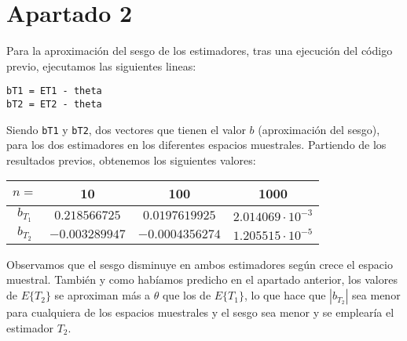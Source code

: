 \documentclass[a4paper,5pt,titlepage]{article}
\begin{document}
	\section{Apartado 2}
		Para la aproximación del sesgo de los estimadores, tras una ejecución del código previo, ejecutamos las siguientes lineas:
		\begin{lstlisting}
bT1 = ET1 - theta
bT2 = ET2 - theta
		\end{lstlisting}
		Siendo \texttt{bT1} y \texttt{bT2}, dos vectores que tienen el valor $b$ (aproximación del sesgo), para los dos estimadores en los diferentes espacios muestrales. Partiendo de los resultados previos, obtenemos los siguientes valores:
		\begin{center}
			\begin{tabular}{|c|c|c|c|}
				\hline
				$n=$  & 10 & 100 & 1000 \\
				\hline
				\hline
				$b_{T_1}$ & $0.218566725$ & $0.0197619925$ & $2.014069\cdot10^{-3}$ \\
				\hline
				$b_{T_2}$ & $-0.003289947$ & $-0.0004356274$ & $1.205515 \cdot10^{-5}$ \\
				\hline
			\end{tabular}
		\end{center}
		Observamos que el sesgo disminuye en ambos estimadores según crece el espacio muestral. También y como habíamos predicho en el apartado anterior, los valores de $E\{T_2\}$ se aproximan más a $\theta$ que los de $E\{T_1\}$, lo que hace que $|b_{T_2}|$ sea menor para cualquiera de los espacios muestrales y el sesgo sea menor y se emplearía el estimador $T_2$. 
\end{document}
